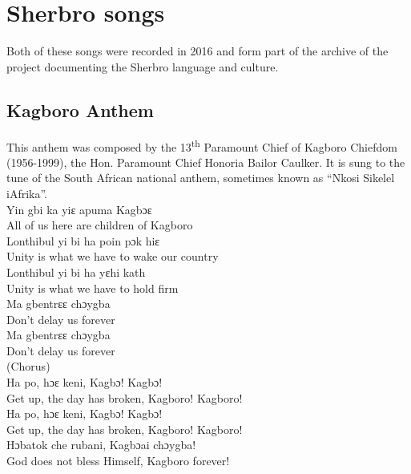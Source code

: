 \chapter{Sherbro songs}
\label{app:e}\hypertarget{Toc115517831}{}
Both of these songs were recorded in 2016 and form part of the archive of the project documenting the Sherbro language and culture.

\section{Kagboro Anthem}
\hypertarget{Toc115517832}{}
This anthem was composed by the 13\textsuperscript{th} Paramount Chief of Kagboro Chiefdom (1956-1999), the Hon. Paramount Chief Honoria Bailor Caulker. It is sung to the tune of the South African national anthem, sometimes known as “Nkosi Sikelel iAfrika”.\\

Yin gbi ka yiɛ apuma Kagbɔɛ\\
All of us here are children of Kagboro\\

Lonthibul yi bi ha poin pɔk hiɛ\\
Unity is what we have to wake our country\\

Lonthibul yi bi ha yɛhi kath\\
Unity is what we have to hold firm\\

Ma gbentrɛɛ chɔygba\\
Don't delay us forever\\

Ma gbentrɛɛ chɔygba\\
Don't delay us forever\\

(Chorus)\\

Ha po, hɔɛ keni, Kagbɔ! Kagbɔ!\\
Get up, the day has broken, Kagboro! Kagboro!\\

Ha po, hɔɛ keni, Kagbɔ! Kagbɔ!\\
Get up, the day has broken, Kagboro! Kagboro!\\

Hɔbatok che rubani, Kagbɔai chɔygba!\\
God does not bless Himself, Kagboro forever!\\

